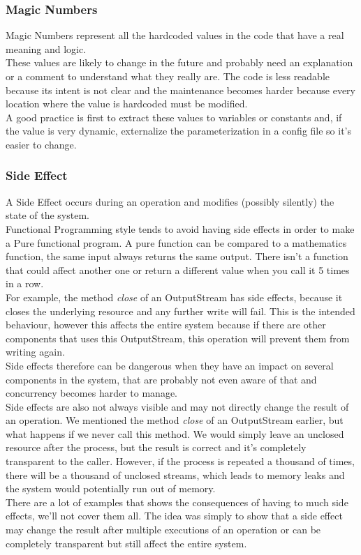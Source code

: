 \subsubsection{Magic Numbers}
Magic Numbers represent all the hardcoded values in the code that have
a real meaning and logic. \\
\newline
These values are likely to change in the future and probably need an
explanation or a comment to understand what they really are.
The code is less readable because its intent is not clear and the
maintenance becomes harder because every location where the value
is hardcoded must be modified. \\
A good practice is first to extract these values to variables or
constants and, if the value is very dynamic, externalize the
parameterization in a config file so it's easier to change.

\subsubsection{Side Effect}
A Side Effect occurs during an operation and modifies (possibly silently)
the state of the system. \\
Functional Programming style tends to avoid having side effects in order
to make a Pure functional program.
A pure function can be compared to a mathematics function, the same
input always returns the same output.
There isn't a function that could affect another one or return a
different value when you call it 5 times in a row. \\
\newline
For example, the method \textit{close} of an OutputStream has side
effects, because it closes the underlying resource and any further
write will fail.
This is the intended behaviour, however this affects the entire system
because if there are other components that uses this OutputStream, this
operation will prevent them from writing again. \\
Side effects therefore can be dangerous when they have an impact on
several components in the system, that are probably not even aware of
that and concurrency becomes harder to manage. \\
\newline
Side effects are also not always visible and may not directly change the
result of an operation.
We mentioned the method \textit{close} of an OutputStream earlier, but
what happens if we never call this method.
We would simply leave an unclosed resource after the process, but the
result is correct and it's completely transparent to the caller.
However, if the process is repeated a thousand of times, there will be
a thousand of unclosed streams, which leads to memory leaks and the
system would potentially run out of memory. \\
\newline
There are a lot of examples that shows the consequences of having
to much side effects, we'll not cover them all.
The idea was simply to show that a side effect may change the result
after multiple executions of an operation or can be completely
transparent but still affect the entire system.

